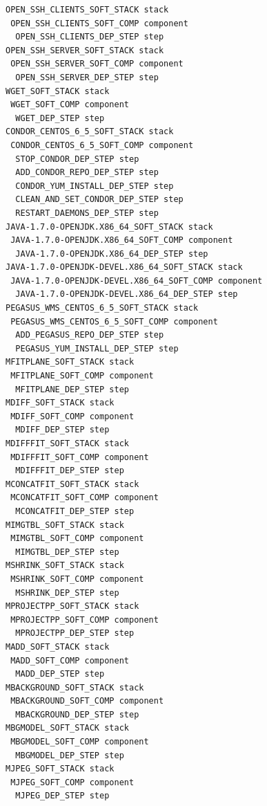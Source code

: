 

\begin{lstlisting}[caption={Abstract deployment plan of the Montage WF},label={lst:plan-montge}]
OPEN_SSH_CLIENTS_SOFT_STACK stack
 OPEN_SSH_CLIENTS_SOFT_COMP component
  OPEN_SSH_CLIENTS_DEP_STEP step
OPEN_SSH_SERVER_SOFT_STACK stack
 OPEN_SSH_SERVER_SOFT_COMP component
  OPEN_SSH_SERVER_DEP_STEP step
WGET_SOFT_STACK stack
 WGET_SOFT_COMP component
  WGET_DEP_STEP step
CONDOR_CENTOS_6_5_SOFT_STACK stack
 CONDOR_CENTOS_6_5_SOFT_COMP component
  STOP_CONDOR_DEP_STEP step
  ADD_CONDOR_REPO_DEP_STEP step
  CONDOR_YUM_INSTALL_DEP_STEP step
  CLEAN_AND_SET_CONDOR_DEP_STEP step
  RESTART_DAEMONS_DEP_STEP step
JAVA-1.7.0-OPENJDK.X86_64_SOFT_STACK stack
 JAVA-1.7.0-OPENJDK.X86_64_SOFT_COMP component
  JAVA-1.7.0-OPENJDK.X86_64_DEP_STEP step
JAVA-1.7.0-OPENJDK-DEVEL.X86_64_SOFT_STACK stack
 JAVA-1.7.0-OPENJDK-DEVEL.X86_64_SOFT_COMP component
  JAVA-1.7.0-OPENJDK-DEVEL.X86_64_DEP_STEP step
PEGASUS_WMS_CENTOS_6_5_SOFT_STACK stack
 PEGASUS_WMS_CENTOS_6_5_SOFT_COMP component
  ADD_PEGASUS_REPO_DEP_STEP step
  PEGASUS_YUM_INSTALL_DEP_STEP step
MFITPLANE_SOFT_STACK stack
 MFITPLANE_SOFT_COMP component
  MFITPLANE_DEP_STEP step
MDIFF_SOFT_STACK stack
 MDIFF_SOFT_COMP component
  MDIFF_DEP_STEP step
MDIFFFIT_SOFT_STACK stack
 MDIFFFIT_SOFT_COMP component
  MDIFFFIT_DEP_STEP step
MCONCATFIT_SOFT_STACK stack
 MCONCATFIT_SOFT_COMP component
  MCONCATFIT_DEP_STEP step
MIMGTBL_SOFT_STACK stack
 MIMGTBL_SOFT_COMP component
  MIMGTBL_DEP_STEP step
MSHRINK_SOFT_STACK stack
 MSHRINK_SOFT_COMP component
  MSHRINK_DEP_STEP step
MPROJECTPP_SOFT_STACK stack
 MPROJECTPP_SOFT_COMP component
  MPROJECTPP_DEP_STEP step
MADD_SOFT_STACK stack
 MADD_SOFT_COMP component
  MADD_DEP_STEP step
MBACKGROUND_SOFT_STACK stack
 MBACKGROUND_SOFT_COMP component
  MBACKGROUND_DEP_STEP step
MBGMODEL_SOFT_STACK stack
 MBGMODEL_SOFT_COMP component
  MBGMODEL_DEP_STEP step
MJPEG_SOFT_STACK stack
 MJPEG_SOFT_COMP component
  MJPEG_DEP_STEP step
\end{lstlisting}


